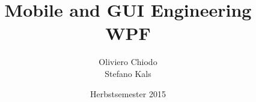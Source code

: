 \documentclass[a4paper,10pt]{extarticle}
\title{Mobile and GUI Engineering\\\Large WPF}
\author{Oliviero Chiodo\\ Stefano Kals}
\date{Herbstsemester 2015}
\affil{Hochschule für Technik Rapperswil}
\begin{document}
\raggedright
\footnotesize
\begin{multicols*}{3}

\setlength{\premulticols}{1pt}
\setlength{\postmulticols}{1pt}
\setlength{\multicolsep}{1pt}
\setlength{\columnsep}{2pt}






\end{multicols*}
\end{document}
